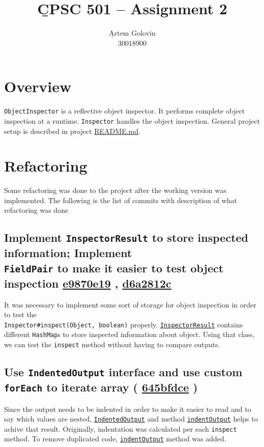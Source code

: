 \documentclass{article}
\title{\b{CPSC 501 -- Assignment 2}}
\author{\b{Artem Golovin} \\ 30018900}
\date{}
\newcommand{\code}[1]{\texttt{#1}}
\newcommand{\gh}[1]{%
  \href{https://github.com/awave1/ObjectInspector/commit/#1}{#1}%
}
\begin{document}
\maketitle

\section*{Overview}

\code{ObjectInspector} is a reflective object inspector. It performs complete object inspection at a runtime. \code{Inspector} handles the object inspection. General project setup is described in project \href{https://github.com/awave1/ObjectInspector#reflective-object-inspector}{README.md}.

\section*{Refactoring}

Some refactoring was done to the project after the working version was implemented. The following is the list of commits with description of what refactoring was done

\subsection*{Implement \code{InspectorResult} to store inspected information; Implement \\ \code{FieldPair} to make it easier to test object inspection \gh{e9870e19}, \gh{d6a2812c}}

It was necessary to implement some sort of storage for object inspection in order to test the \\ \code{Inspector\#inspect(Object, boolean)} properly. \href{https://github.com/awave1/ObjectInspector/blob/master/src/main/java/inspector/InspectorResult.java}{\code{InspectorResult}} contains different \code{HashMap}s to store inspected information about object. Using that class, we can test the \code{inspect} method without having to compare outputs.

\subsection*{Use \code{IndentedOutput} interface and use custom \code{forEach} to iterate array (\gh{645bfdce})}

Since the output needs to be indented in order to make it easier to read and to say which values are nested, \href{https://github.com/awave1/ObjectInspector/blob/master/src/main/java/utils/IndentedOutput.java}{\code{IndentedOutput}} and method \href{https://github.com/awave1/ObjectInspector/blob/master/src/main/java/inspector/Inspector.java#L199}{\code{indentOutput}} helps to achive that result. Originally, indentation was calculated per each \code{inspect} method. To remove duplicated code, \href{https://github.com/awave1/ObjectInspector/blob/master/src/main/java/inspector/Inspector.java#L199}{\code{indentOutput}} method was added.
\end{document}
